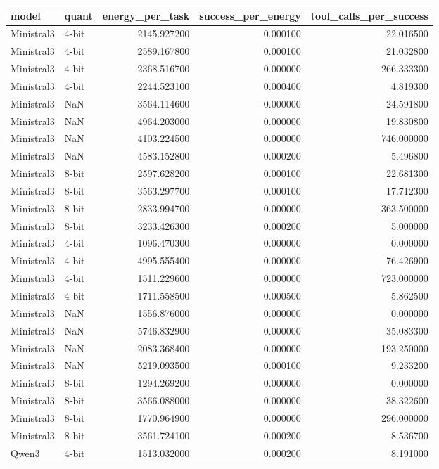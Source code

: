 \begin{tabular}{llrrr}
\toprule
model & quant & energy_per_task & success_per_energy & tool_calls_per_success \\
\midrule
Ministral3 & 4-bit & 2145.927200 & 0.000100 & 22.016500 \\
Ministral3 & 4-bit & 2589.167800 & 0.000100 & 21.032800 \\
Ministral3 & 4-bit & 2368.516700 & 0.000000 & 266.333300 \\
Ministral3 & 4-bit & 2244.523100 & 0.000400 & 4.819300 \\
Ministral3 & NaN & 3564.114600 & 0.000000 & 24.591800 \\
Ministral3 & NaN & 4964.203000 & 0.000000 & 19.830800 \\
Ministral3 & NaN & 4103.224500 & 0.000000 & 746.000000 \\
Ministral3 & NaN & 4583.152800 & 0.000200 & 5.496800 \\
Ministral3 & 8-bit & 2597.628200 & 0.000100 & 22.681300 \\
Ministral3 & 8-bit & 3563.297700 & 0.000100 & 17.712300 \\
Ministral3 & 8-bit & 2833.994700 & 0.000000 & 363.500000 \\
Ministral3 & 8-bit & 3233.426300 & 0.000200 & 5.000000 \\
Ministral3 & 4-bit & 1096.470300 & 0.000000 & 0.000000 \\
Ministral3 & 4-bit & 4995.555400 & 0.000000 & 76.426900 \\
Ministral3 & 4-bit & 1511.229600 & 0.000000 & 723.000000 \\
Ministral3 & 4-bit & 1711.558500 & 0.000500 & 5.862500 \\
Ministral3 & NaN & 1556.876000 & 0.000000 & 0.000000 \\
Ministral3 & NaN & 5746.832900 & 0.000000 & 35.083300 \\
Ministral3 & NaN & 2083.368400 & 0.000000 & 193.250000 \\
Ministral3 & NaN & 5219.093500 & 0.000100 & 9.233200 \\
Ministral3 & 8-bit & 1294.269200 & 0.000000 & 0.000000 \\
Ministral3 & 8-bit & 3566.088000 & 0.000000 & 38.322600 \\
Ministral3 & 8-bit & 1770.964900 & 0.000000 & 296.000000 \\
Ministral3 & 8-bit & 3561.724100 & 0.000200 & 8.536700 \\
Qwen3 & 4-bit & 1513.032000 & 0.000200 & 8.191000 \\

\end{tabular}

